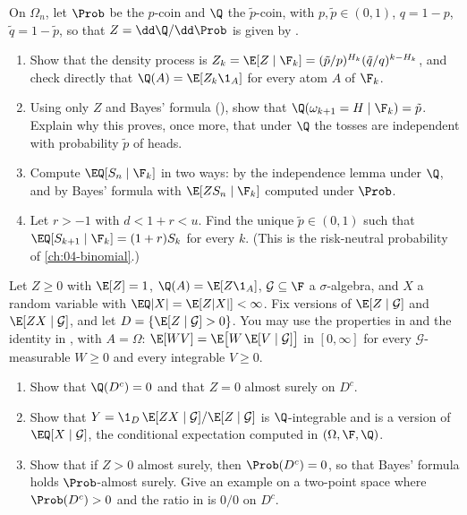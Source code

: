 \begin{exercise}\label{ex:pr-coin-measures}
\medium On $\Omega_n$, let $\Prob$ be the $p$-coin and $\Q$ the $\tilde p$-coin, with
$p,\tilde p\in(0,1)$, $q=1-p$, $\tilde q=1-\tilde p$, so that $Z=\dd\Q/\dd\Prob$ is given by
.
\begin{enumerate}[label=(\alph*)]
  \item Show that the density process is
    $Z_k=\E[Z\mid\F_k]=(\tilde p/p)^{H_k}(\tilde q/q)^{k-H_k}$, and check directly that
    $\Q(A)=\E[Z_k\1_A]$ for every atom $A$ of $\F_k$.
  \item Using only $Z$ and Bayes' formula (), show that
    $\Q(\omega_{k+1}=H\mid\F_k)=\tilde p$. Explain why this proves, once more, that under $\Q$
    the tosses are independent with probability $\tilde p$ of heads.
  \item Compute $\EQ[S_n\mid\F_k]$ in two ways: by the independence lemma under $\Q$, and by
    Bayes' formula with $\E[Z S_n\mid\F_k]$ computed under $\Prob$.
  \item Let $r>-1$ with $d<1+r<u$. Find the unique $\tilde p\in(0,1)$ such that
    $\EQ[S_{k+1}\mid\F_k]=(1+r)S_k$ for every $k$. (This is the risk-neutral probability of
    \cref{ch:04-binomial}.)
\end{enumerate}
\end{exercise}

\begin{exercise}\label{ex:pr-bayes-general}
\hard Let $Z\ge0$ with $\E[Z]=1$, $\Q(A)=\E[Z\1_A]$, $\mathcal G\subseteq\F$ a
$\sigma$-algebra, and $X$ a random variable with $\EQ|X|=\E[Z|X|]<\infty$. Fix versions of
$\E[Z\mid\mathcal G]$ and $\E[ZX\mid\mathcal G]$, and let $D=\{\E[Z\mid\mathcal G]>0\}$. You
may use the properties in  and the identity in
, with $A=\Omega$: $\E[WV]=\E\big[W\,\E[V\mid\mathcal G]\big]$ in $[0,\infty]$
for every $\mathcal G$-measurable $W\ge0$ and every integrable $V\ge0$.
\begin{enumerate}[label=(\alph*)]
  \item Show that $\Q(D^c)=0$ and that $Z=0$ almost surely on $D^c$.
  \item Show that $Y=\1_D\,\E[ZX\mid\mathcal G]/\E[Z\mid\mathcal G]$ is $\Q$-integrable and is a
    version of $\EQ[X\mid\mathcal G]$, the conditional expectation computed in
    $(\Omega,\F,\Q)$.
  \item Show that if $Z>0$ almost surely, then $\Prob(D^c)=0$, so that Bayes' formula holds
    $\Prob$-almost surely. Give an example on a two-point space where $\Prob(D^c)>0$ and the
    ratio in  is $0/0$ on $D^c$.
\end{enumerate}
\end{exercise}

